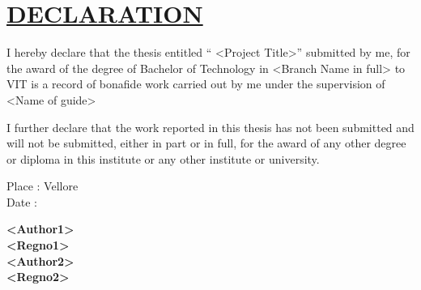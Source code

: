 \documentclass[a4paper,12pt,bibliography=totocnumbered]{report}
\begin{document}
	\chapter*{\underline{DECLARATION}}
	\par I hereby declare that the thesis entitled ``  <Project Title>'' submitted by me, for the award of the degree of Bachelor of Technology in <Branch Name in full> to VIT is a record of bonafide work carried out by me under the supervision of <Name of guide>\\
	\par I further declare that the work reported in this thesis has not been submitted and will not be submitted, either in part or in full, for the award of any other degree or diploma in this institute or any other institute or university.\\
	\vspace{15mm}
	\begin{flushleft}
		Place : Vellore\\
		Date : 
	\end{flushleft}
	\begin{flushright}
		\textbf{<Author1> \\ <Regno1>  \\}
		\vspace*{70px}
		\textbf{<Author2> \\ <Regno2> \\}
	\end{flushright}
\end{document}
